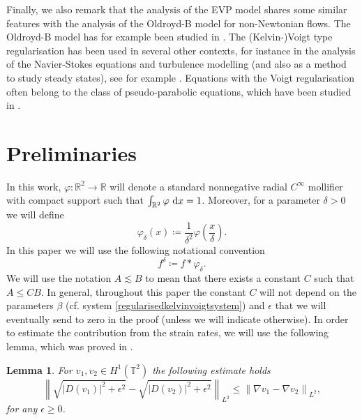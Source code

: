 \documentclass[12pt,a4paper]{article}
\newtheorem{lemma}[theorem]{Lemma}
\theoremstyle{definition}
\theoremstyle{remark}
\numberwithin{equation}{section}
\newcommand{\dx}{\ {\rm d} {x}}
\begin{document}
Finally, we also remark that the analysis of the EVP model shares some similar features with the analysis of the Oldroyd-B model for non-Newtonian flows. The Oldroyd-B model has for example been studied in \cite{chemin,constantin2012,constantin2021,elgindi,guillope,kupferman,lin,lions}. The (Kelvin-)Voigt type regularisation has been used in several other contexts, for instance in the analysis of the Navier-Stokes equations and turbulence modelling (and also as a method to study steady states), see for example \cite{oskolkov1977,oskolkov1997,larios2010,larios2010boussinesq,larios2014,antontsev,constantin2023,ignatova}. Equations with the Voigt regularisation often belong to the class of pseudo-parabolic equations, which have been studied in \cite{showalter1970a,showalter1970b,showalter1975}.

\section{Preliminaries}
In this work, $\varphi : \mathbb{R}^2 \rightarrow \mathbb{R}$ will denote a standard nonnegative radial $C^\infty$ mollifier with compact support such that $\int_{\mathbb{R}^2} \varphi \dx = 1$. Moreover, for a parameter $\delta > 0$ we will define
\begin{equation*}
\varphi_\delta (x) \coloneqq \frac{1}{\delta^2} \varphi \left( \frac{x}{\delta} \right).
\end{equation*}
In this paper we will use the following notational convention
\begin{equation} \label{mollification}
f^\delta \coloneqq f * \varphi_\delta.
\end{equation}
We will use the notation $A \lesssim B$ to mean that there exists a constant $C$ such that $A \leq C B$. In general, throughout this paper the constant $C$ will not depend on the parameters $\beta$ (cf. system \eqref{regularisedkelvinvoigtsystem}) and $\epsilon$ that we will eventually send to zero in the proof (unless we will indicate otherwise). In order to estimate the contribution from the strain rates, we will use the following lemma, which was proved in \cite[Lemma 2.3]{boutros2025}.
\begin{lemma} \label{strainratelemma}
For $v_1, v_2 \in H^1 (\mathbb{T}^2)$ the following estimate holds
\begin{equation}
\left\lVert \sqrt{\lvert D(v_1) \rvert^2 + \epsilon^2} - \sqrt{\lvert D(v_2) \rvert^2 + \epsilon^2} \right\rVert_{L^2} \leq \left\lVert \nabla v_1 - \nabla v_2 \right\rVert_{L^2},
\end{equation}
for any $\epsilon \geq 0$.
\end{lemma}
\end{document}
